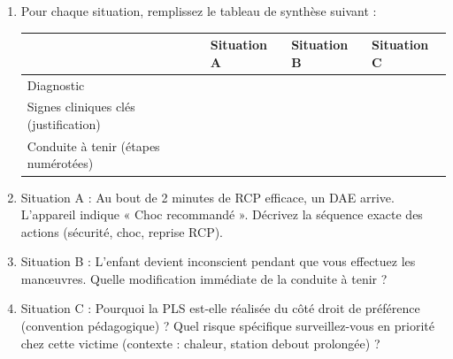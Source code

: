 \documentclass[11pt]{article}
\begin{document}
\begin{exercice}
\begin{enumerate}
    \item Pour chaque situation, remplissez le tableau de synthèse suivant :
    \begin{center}
    \begin{tabularx}{\linewidth}{|l|X|X|X|}
    \hline
    \rowcolor{popblueL}
    & \textbf{Situation A} & \textbf{Situation B} & \textbf{Situation C} \\
    \hline
    Diagnostic & & & \\
    \hline
    Signes cliniques clés (justification) & & & \\
    \hline
    Conduite à tenir (étapes numérotées) & & & \\
    \hline
    \end{tabularx}
    \end{center}
    \item Situation A : Au bout de 2 minutes de RCP efficace, un DAE arrive. L'appareil indique « Choc recommandé ». Décrivez la séquence exacte des actions (sécurité, choc, reprise RCP).
    \item Situation B : L'enfant devient inconscient pendant que vous effectuez les manœuvres. Quelle modification immédiate de la conduite à tenir ?
    \item Situation C : Pourquoi la PLS est-elle réalisée du côté droit de préférence (convention pédagogique) ? Quel risque spécifique surveillez-vous en priorité chez cette victime (contexte : chaleur, station debout prolongée) ?
\end{enumerate}
\end{exercice}
\end{document}
